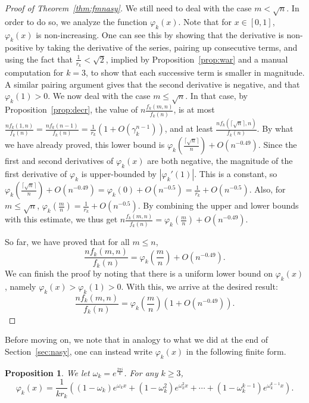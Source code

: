 \documentclass{amsart}
\newtheorem{proposition}[theorem]{Proposition}
\theoremstyle{definition}
\begin{document}
\begin{proof}[Proof of Theorem~\ref{thm:fmnasy}]
We still need to deal with the case $m<\sqrt{n}$. In order to do so, we analyze the function $\varphi_k(x)$. Note that for $x\in [0,1]$, $\varphi_k(x)$ is non-increasing. One can see this by showing that the derivative is non-positive by taking the derivative of the series, pairing up consecutive terms, and using the fact that $\frac{1}{r_k}<\sqrt{2}$, implied by Proposition~\ref{prop:war} and a manual computation for $k=3$, to show that each successive term is smaller in magnitude. A similar pairing argument gives that the second derivative is negative, and that $\varphi_k(1)>0$. We now deal with the case $m\leq \sqrt{n}$. In that case, by Proposition~\ref{prop:decr}, the value of $n\frac{f_k(m,n)}{f_k(n)}$, is at most $\frac{nf_k(1,n)}{f_k(n)}=\frac{nf_k(n-1)}{f_k(n)}=\frac{1}{r_k}\left(1+O(\gamma_k^{n-1})\right)$, and at least $\frac{n f_k(\lceil\sqrt{n}\rceil,n)}{f_k(n)}$. By what we have already proved, this lower bound is $\varphi_k\left(\frac{\lceil\sqrt{n}\rceil}{n}\right)+O(n^{-0.49})$. Since the first and second derivatives of $\varphi_k(x)$ are both negative, the magnitude of the first derivative of $\varphi_k$ is upper-bounded by $|\varphi_k'(1)|$. This is a constant, so $\varphi_k\left(\frac{\lceil\sqrt{n}\rceil}{n}\right)+O(n^{-0.49})=\varphi_k(0)+O(n^{-0.5})=\frac{1}{r_k}+O(n^{-0.5})$. Also, for $m\leq \sqrt{n}$, $\varphi_k(\frac{m}{n})=\frac{1}{r_k}+O(n^{-0.5})$. By combining the upper and lower bounds with this estimate, we thus get $n\frac{f_k(m,n)}{f_k(n)}=\varphi_k\left(\frac{m}{n}\right)+O(n^{-0.49})$.

So far, we have proved that for all $m\leq n$,
\[\frac{nf_k(m,n)}{f_k(n)}=\varphi_k\left(\frac{m}{n}\right)+O(n^{-0.49}).\]
We can finish the proof by noting that there is a uniform lower bound on $\varphi_k(x)$, namely $\varphi_k(x)>\varphi_k(1)>0$. With this, we arrive at the desired result:
\[\frac{nf_k(m,n)}{f_k(n)}=\varphi_k\left(\frac{m}{n}\right)\left(1+O(n^{-0.49})\right).\]


\end{proof}













Before moving on, we note that in analogy to what we did at the end of Section~\ref{sec:nasy}, one can instead write $\varphi_k(x)$ in the following finite form.

\begin{proposition}
We let $\omega_k=e^{\frac{2\pi i}{k}}$. For any $k\geq 3$,
\[\varphi_k(x)=\frac{1}{k r_k}\left((1-\omega_k)e^{\omega_kx}+\left(1-\omega_k^2\right)e^{\omega_k^2 x}+\cdots+\left(1-\omega_k^{k-1}\right)e^{\omega_k^{k-1}x}\right).\]
\end{proposition}
\end{document}
